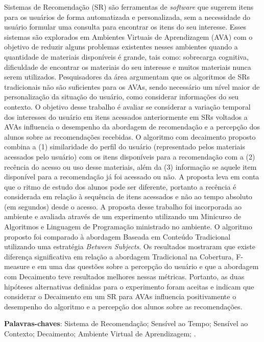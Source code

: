 \begin{resumo}
  Sistemas de Recomendação (SR) são ferramentas de \textit{software} que sugerem itens para os usuários de forma automatizada e
  personalizada, sem a necessidade do usuário formular uma consulta para encontrar os itens do seu interesse. Esses
  sistemas são explorados em Ambientes Virtuais de Aprendizagem (AVA) com o objetivo de reduzir alguns problemas
  existentes nesses ambientes quando a quantidade de materiais disponíveis é grande, tais como: sobrecarga cognitiva,
  dificuldade de encontrar os materiais do seu interesse e muitos materiais nunca serem utilizados. Pesquisadores da
  área argumentam que os algoritmos de SRs tradicionais não são suficientes para os AVAs, sendo necessário um nível
  maior de personalização da situação do usuário, como considerar informações do seu contexto. O objetivo desse trabalho é
  avaliar se considerar a variação temporal dos interesses do usuário em itens acessados anteriormente em SRs voltados a AVAs
  influencia o desempenho da abordagem de recomendação e a percepção dos alunos sobre as recomendações recebidas. O
  algoritmo com decaimento proposto combina a (1) similaridade do perfil do usuário
  (representado pelos materiais acessados pelo usuário) com os itens disponíveis para a recomendação com a (2) recência
  do acesso ou uso desse materiais, além da (3) informação se aquele item disponível para a recomendação já foi acessado
  ou não. A proposta leva em conta que o ritmo de estudo dos alunos pode ser diferente, portanto a recência é
  considerada em relação à sequência de itens acessados e não ao tempo absoluto (em segundos) desde o acesso. A proposta
  desse trabalho foi incorporada ao ambiente \adaptwebspace e avaliada através de um experimento utilizando um Minicurso
  de Algoritmos e Linguagem de Programação ministrado no ambiente. O algoritmo proposto foi comparado à abordagem
  Baseada em Conteúdo Tradicional utilizando uma estratégia \textit{Between Subjects}. Os resultados mostraram
  que existe diferença significativa em relação a abordagem Tradicional na Cobertura, F-measure e em uma das questões
  sobre a percepção do usuário e que a abordagem com Decaimento teve resultados melhores nessas métricas. Portanto, as
  duas hipóteses alternativas definidas para o experimento foram aceitas e indicam que considerar o Decaimento em um SR
  para AVAs influencia positivamente o desempenho do algoritmo e a percepção dos alunos sobre as recomendações.

  \vspace{\onelineskip}

  \noindent
  \textbf{Palavras-chaves}: Sistema de Recomendação; Sensível ao Tempo; Sensível ao Contexto; Decaimento; Ambiente Virtual de Aprendizagem; \adaptweb.
\end{resumo}

